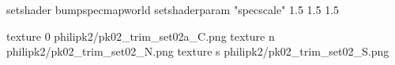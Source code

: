 setshader bumpspecmapworld
setshaderparam "specscale" 1.5 1.5 1.5

texture 0 philipk2/pk02_trim_set02a_C.png
texture n philipk2/pk02_trim_set02_N.png
texture s philipk2/pk02_trim_set02_S.png

